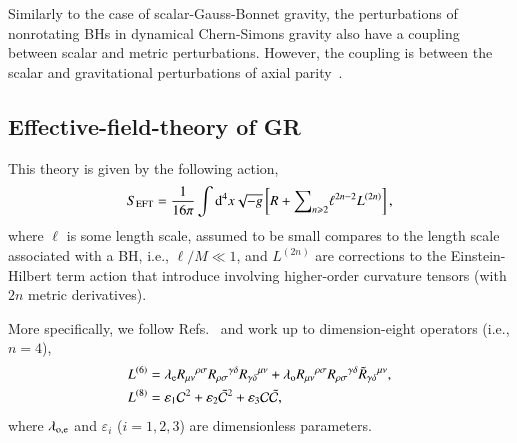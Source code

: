 \documentclass[twocolumn,
               prd,
               aps,
               superscriptaddress,
               tightenlines,
               nofootinbib,
               eqsecnum,
               amsfonts,
               amsmath,
               longbibliography]{revtex4-1}
\newcommand{\dd}{{\rm d}}
\newcommand{\lame}{\lambda_{\rm e}}
\newcommand{\lamo}{\lambda_{\rm o}}
\begin{document}
Similarly to the case of scalar-Gauss-Bonnet gravity, the perturbations of nonrotating
BHs in dynamical Chern-Simons gravity also have a coupling between scalar and
metric perturbations. However, the coupling is between the scalar and gravitational perturbations
of axial parity~\cite{Yunes:2007ss,Cardoso:2009pk,Molina:2010fb,Wagle:2021tam}.

%
%
%

\subsection{Effective-field-theory of GR}

This theory is given by the following action,
%
\begin{equation} \label{eq:action_eft}
    S_{\rm EFT} = \frac{1}{16 \pi}
    \int \dd^4x \sqrt{-g}
    \left[ R
    +
    {\sum}_{n \geqslant 2} \ell^{2n - 2} L^{(2n)}
    \right],
\end{equation}
%
where $\ell$ is some length scale, assumed to be small compares to the length
scale associated with a BH, i.e., $\ell / M \ll 1$, and
$L^{(2n)}$ are corrections to the Einstein-Hilbert term action that
introduce involving higher-order curvature tensors (with $2n$ metric
derivatives).

More specifically, we follow Refs.~\cite{Cano:2020cao,Cano:2021myl} and work up
to dimension-eight operators (i.e., $n=4$),
%
\begin{subequations}
\label{eq:action_mods}
\begin{align}
    L^{(6)} &= \lame R_{\mu\nu}{}^{\rho\sigma} R_{\rho\sigma}{}^{\gamma\delta} R_{\gamma \delta}{}^{\mu\nu}
    + \lamo R_{\mu\nu}{}^{\rho\sigma} R_{\rho\sigma}{}^{\gamma\delta} \tilde{R}_{\gamma \delta}{}^{\mu\nu},
    \label{eq:s_6}
    \\
    L^{(8)} &= \varepsilon_{1} \mathcal{C}^2
    + \varepsilon_{2} \tilde{\mathcal{C}}^{2}
    + \varepsilon_{3} \mathcal{C} \tilde{\mathcal{C}},
\label{eq:s_8}
\end{align}
\end{subequations}
%
where $\lambda_{\rm o, e}$ and $\varepsilon_{i}$ ($i=1,2,3$) are dimensionless parameters.
\end{document}
